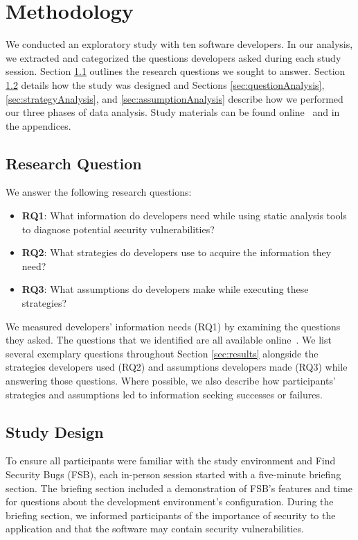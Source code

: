 \documentclass[10pt,journal,compsoc]{IEEEtran}
\begin{document}


\section{Methodology}
\label{sec:meth}
We conducted an exploratory study with ten software developers. In our analysis, we extracted and categorized the questions developers asked during each study session. 
Section \ref{rqs} outlines the research questions we sought to answer. 
Section \ref{studyDesign} details how the study was designed and Sections \ref{sec:questionAnalysis}, \ref{sec:strategyAnalysis}, and \ref{sec:assumptionAnalysis} describe how we performed our three phases of data analysis.
Study materials can be found online~\cite{ExperimentalMaterials} and in the appendices.

\subsection{Research Question}
\label{rqs}
We answer the following research questions:
\begin{itemize}
	\item \textbf{RQ1}: What information do developers need while using static analysis tools to diagnose potential security vulnerabilities? 
	\item \textbf{RQ2}: What strategies do developers use to acquire the information they need?
	\item \textbf{RQ3}: What assumptions do developers make while executing these strategies?
	\end{itemize}
We measured developers' information needs (RQ1) by examining the questions they asked.
The questions that we identified are all available online~\cite{ExperimentalMaterials}.
We list several exemplary questions throughout Section \ref{sec:results} alongside the strategies developers used (RQ2) and assumptions developers made (RQ3) while answering those questions.
Where possible, we also describe how participants' strategies and assumptions led to information seeking successes or failures.


\subsection{Study Design}
\label{studyDesign}
To ensure all participants were familiar with the study environment and Find Security Bugs (FSB),
each in-person session started with a five-minute briefing section.
The briefing section included a demonstration of FSB's features and time for questions about the development environment's configuration.
During the briefing section, we informed participants of the importance of security to the application and that the software may contain security vulnerabilities.
\end{document}
